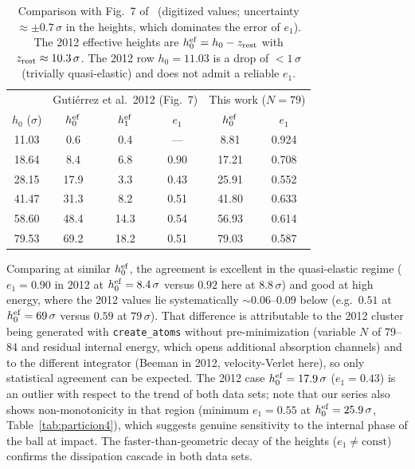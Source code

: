 \documentclass[aps,pre,twocolumn,reprint,superscriptaddress]{revtex4-2}
\begin{document}
\begin{table}[tp]
\centering
\small
\caption{Comparison with Fig.~7 of~\cite{Gutierrez2012} (digitized values;
uncertainty $\approx\pm0.7\,\sigma$ in the heights, which dominates the
error of $e_1$). The 2012 effective heights are
$h_0^{\rm ef}=h_0-z_{\rm rest}$ with $z_{\rm rest}\approx10.3\,\sigma$.
The 2012 row $h_0=11.03$ is a drop of $<1\,\sigma$ (trivially
quasi-elastic) and does not admit a reliable $e_1$.}
\label{tab:comparacion2012}
\begin{tabular}{c|ccc|cc}
\toprule
 & \multicolumn{3}{c|}{Gutiérrez et al.\ 2012 (Fig.~7)} &
 \multicolumn{2}{c}{This work ($N=79$)} \\
$h_0$ ($\sigma$) & $h_0^{\rm ef}$ & $h_1^{\rm ef}$ & $e_1$ &
$h_0^{\rm ef}$ & $e_1$ \\
\midrule
11.03 &  0.6 &  0.4 & ---  &  8.81 & 0.924 \\
18.64 &  8.4 &  6.8 & 0.90 & 17.21 & 0.708 \\
28.15 & 17.9 &  3.3 & 0.43 & 25.91 & 0.552 \\
41.47 & 31.3 &  8.2 & 0.51 & 41.80 & 0.633 \\
58.60 & 48.4 & 14.3 & 0.54 & 56.93 & 0.614 \\
79.53 & 69.2 & 18.2 & 0.51 & 79.03 & 0.587 \\
\bottomrule
\end{tabular}
\end{table}

Comparing at similar $h_0^{\rm ef}$, the agreement is excellent in the
quasi-elastic regime ($e_1=0.90$ in 2012 at $h_0^{\rm ef}=8.4\,\sigma$
versus $0.92$ here at $8.8\,\sigma$) and good at high energy, where the
2012 values lie systematically $\sim0.06$--$0.09$ below (e.g.\ $0.51$ at
$h_0^{\rm ef}=69\,\sigma$ versus $0.59$ at $79\,\sigma$). That difference
is attributable to the 2012 cluster being generated with
\texttt{create\_atoms} without pre-minimization (variable $N$ of 79--84 and
residual internal energy, which opens additional absorption channels) and
to the different integrator (Beeman in 2012, velocity-Verlet here), so only
statistical agreement can be expected. The 2012 case
$h_0^{\rm ef}=17.9\,\sigma$ ($e_1=0.43$) is an outlier with respect to the
trend of both data sets; note that our series also shows non-monotonicity
in that region (minimum $e_1=0.55$ at $h_0^{\rm ef}=25.9\,\sigma$,
Table~\ref{tab:particion4}), which suggests genuine sensitivity to the
internal phase of the ball at impact. The faster-than-geometric decay of
the heights ($e_1\neq\mathrm{const}$) confirms the dissipation cascade in
both data sets.
\end{document}
